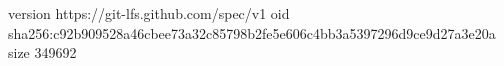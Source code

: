 version https://git-lfs.github.com/spec/v1
oid sha256:c92b909528a46cbee73a32c85798b2fe5e606c4bb3a5397296d9ce9d27a3e20a
size 349692

